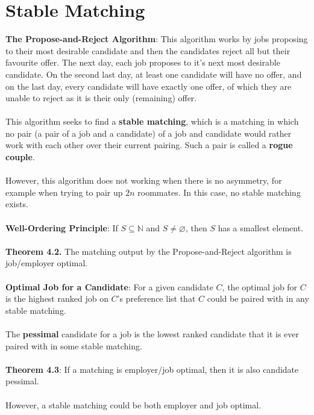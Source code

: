 \documentclass{article}
\theoremstyle{definition}
\begin{document}
\section*{Stable Matching}
\textbf{The Propose-and-Reject Algorithm}: This algorithm works by jobs proposing to their most desirable candidate and then the candidates reject all but their favourite offer. The next day, each job proposes to it's next most desirable candidate. On the second last day, at least one candidate will have no offer, and on the last day, every candidate will have exactly one offer, of which they are unable to reject as it is their only (remaining) offer. \\ \\
This algorithm seeks to find a \textbf{stable matching}, which is a matching in which no pair (a pair of a job and a candidate) of a job and candidate would rather work with each other over their current pairing. Such a pair is called a \textbf{rogue couple}. \\ \\
However, this algorithm does not working when there is no asymmetry, for example when trying to pair up $2n$ roommates. In this case, no stable matching exists. \\ \\
\textbf{Well-Ordering Principle}: If $S \subseteq \mathbb{N}$ and $S \neq \varnothing$, then $S$ has a smallest element. \\ \\
\textbf{Theorem 4.2.} The matching output by the Propose-and-Reject algorithm is job/employer optimal. \\ \\
\textbf{Optimal Job for a Candidate}: For a given candidate $C$, the optimal job for $C$ is the highest ranked job on $C$’s preference list that $C$ could be paired with in any stable matching. \\ \\
The \textbf{pessimal} candidate for a job is the lowest ranked candidate that it is ever paired with in some stable matching. \\ \\
\textbf{Theorem 4.3}: If a matching is employer/job optimal, then it is also candidate pessimal. \\ \\
However, a stable matching could be both employer and job optimal.
\end{document}
